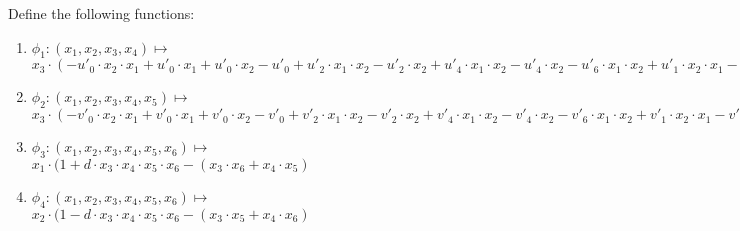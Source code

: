 Define the following functions:
\begin{enumerate}
	\item $\phi_1: (x_1, x_2, x_3, x_4) \mapsto $ \\
				$x_3 \cdot (-u'_0 \cdot x_2 \cdot x_1 + u'_0 \cdot x_1 + u'_0 \cdot x_2
				- u'_0 + u'_2 \cdot x_1 \cdot x_2 - u'_2\cdot x_2 + u'_4 \cdot x_1 \cdot x_2
				- u'_4\cdot x_2 -u'_6 \cdot x_1 \cdot x_2 + u'_1 \cdot x_2 \cdot x_1
				- u'_1 \cdot x_1 - u'_1 \cdot x_2 + u'_1  - u'_3 \cdot x_1 \cdot x_2 + u'_3\cdot x_2
				- u'_5 \cdot x_1 \cdot x_2 + u'_5\cdot x_2 + u'_7 \cdot x_1 \cdot x_2) -
				(x_4 - u'_0 \cdot x_2 \cdot x_1 + u'_0 \cdot x_1 + u'_0 \cdot x_2
				- u'_0 + u'_2 \cdot x_1 \cdot x_2 - u'_2\cdot x_2 + u'_4 \cdot x_1 \cdot x_2
				- u'_4\cdot x_2 -u'_6 \cdot x_1 \cdot x_2)$
	\item $\phi_2: (x_1, x_2, x_3, x_4, x_5) \mapsto $ \\
				$x_3 \cdot (-v'_0 \cdot x_2 \cdot x_1 + v'_0 \cdot x_1 + v'_0 \cdot x_2
				- v'_0 + v'_2 \cdot x_1 \cdot x_2 -v'_2 \cdot x_2 + v'_4 \cdot x_1 \cdot x_2
				- v'_4 \cdot x_2 - v'_6 \cdot x_1 \cdot x_2 + v'_1 \cdot x_2 \cdot x_1
				- v'_1 \cdot x_1 - v'_1 \cdot x_2 + v'_1  - v'_3 \cdot x_1 \cdot x_2
				+ v'_3 \cdot x_2 - v'_5 \cdot x_1 \cdot x_2 + v'_5 \cdot x_2
				+ v'_7 \cdot x_1 \cdot x_2) - (x_5 - v'_0 \cdot x_2 \cdot x_1
				+ v'_0 \cdot x_1 + v'_0 \cdot x_2 - v'_0 + v'_2 \cdot x_1 \cdot x_2
				- v'_2 \cdot x_2 + v'_4 \cdot x_1 \cdot x_2 - v'_4 \cdot x_2 - v'_6 \cdot x_1 \cdot x_2) $
	\item $\phi_3: (x_1, x_2, x_3, x_4, x_5, x_6) \mapsto $ \\
				$x_1 \cdot (1 + d \cdot x_3 \cdot x_4 \cdot x_5 \cdot x_6
				- (x_3 \cdot x_6 + x_4 \cdot x_5)$
	\item $\phi_4: (x_1, x_2, x_3, x_4, x_5, x_6) \mapsto $ \\
				$x_2 \cdot (1 - d \cdot x_3 \cdot x_4 \cdot x_5 \cdot x_6 - (x_3 \cdot x_5 + x_4 \cdot x_6)$
\end{enumerate}

